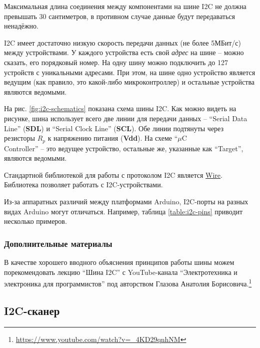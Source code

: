 \documentclass[../sparc.tex]{subfiles}
\begin{document}
Максимальная длина соединения между компонентами на шине \gls{I2C} не должна
превышать 30 сантиметров, в противном случае данные будут передаваться
ненадёжно.

\gls{I2C} имеет достаточно низкую скорость передачи данных (не более 5МБит/с)
между устройствами. У каждого устройства есть свой \textit{адрес} на шине --
можно сказать, его порядковый номер. На одну шину можно подключить до 127
устройств с уникальными адресами. При этом, на шине одно устройство является
ведущим (как правило, это какой-либо микроконтроллер) и остальные устройства
являются ведомыми.

На рис. \ref{fig:i2c-schematics} показана схема шины \gls{I2C}. Как можно видеть
на рисунке, шина использует всего две линии для передачи данных -- ``Serial Data
Line'' (\textbf{SDL}) и ``Serial Clock Line'' (\textbf{SCL}). Обе линии
подтянуты через резисторы \textbf{$R_p$} к напряжению питания (\textbf{Vdd}). На
схеме ``$\mu$C\\Controller'' -- это ведущее устройство, остальные же, указанные как
``Target'', являются ведомыми.


Стандартной библиотекой для работы с протоколом I2C является
\href{https://www.arduino.cc/reference/en/language/functions/communication/wire/}{Wire}.
Библиотека позволяет работать с I2C-устройствами.


Из-за аппаратных различий между платформами Arduino, I2C-порты на разных видах
Arduino могут отличаться. Например, таблица \ref{table:i2c-pins} приводит
несколько примеров.

\subsubsection{Дополнительные материалы}

В качестве хорошего вводного объяснения принципов работы шины можем
порекомендовать лекцию ``Шина I2C'' с YouTube-канала ``Электротехника и
электроника для программистов'' под авторством Глазова Анатолия
Борисовича.\footnote{\url{https://www.youtube.com/watch?v=_4KD29qnhNM}}

\subsection{I2C-сканер}
\label{section:i2c-scanner}
\end{document}
